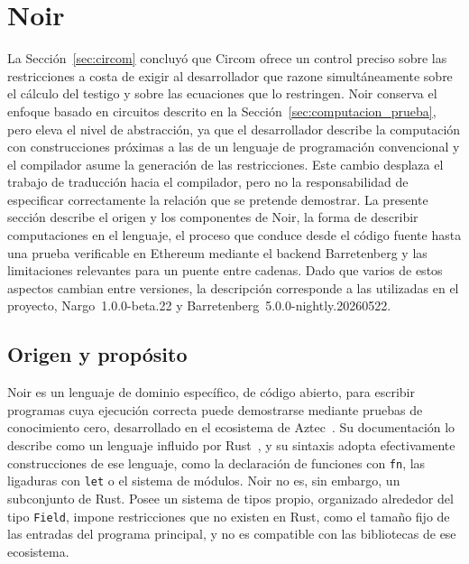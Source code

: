 \section{Noir}
\label{sec:noir}

La Sección~\ref{sec:circom} concluyó que Circom ofrece un control preciso sobre las restricciones
a costa de exigir al desarrollador que razone simultáneamente sobre el cálculo del testigo y sobre
las ecuaciones que lo restringen. Noir conserva el enfoque basado en circuitos descrito en la
Sección~\ref{sec:computacion_prueba}, pero eleva el nivel de abstracción, ya que el desarrollador
describe la computación con construcciones próximas a las de un lenguaje de programación
convencional y el compilador asume la generación de las restricciones. Este cambio desplaza el
trabajo de traducción hacia el compilador, pero no la responsabilidad de especificar
correctamente la relación que se pretende demostrar. La presente sección describe el origen y
los componentes de Noir, la forma de describir computaciones en el lenguaje, el proceso que
conduce desde el código fuente hasta una prueba verificable en Ethereum mediante el backend
Barretenberg y las limitaciones relevantes para un puente entre cadenas. Dado que varios de estos
aspectos cambian entre versiones, la descripción corresponde a las utilizadas en el proyecto,
Nargo~1.0.0-beta.22 y Barretenberg~5.0.0-nightly.20260522.

\subsection{Origen y propósito}
\label{sec:noir_origen}

Noir es un lenguaje de dominio específico, de código abierto, para escribir programas cuya
ejecución correcta puede demostrarse mediante pruebas de conocimiento cero, desarrollado en el
ecosistema de Aztec~\cite{noirlang, noirrepo}. Su documentación lo describe como un lenguaje
influido por Rust~\cite{noirdocsbeta}, y su sintaxis adopta efectivamente construcciones de ese
lenguaje, como la declaración de funciones con \lstinline|fn|, las ligaduras con \lstinline|let|
o el sistema de módulos. Noir no es, sin embargo, un subconjunto de Rust. Posee un sistema de
tipos propio, organizado alrededor del tipo \lstinline|Field|, impone restricciones que no
existen en Rust, como el tamaño fijo de las entradas del programa principal, y no es compatible
con las bibliotecas de ese ecosistema.

